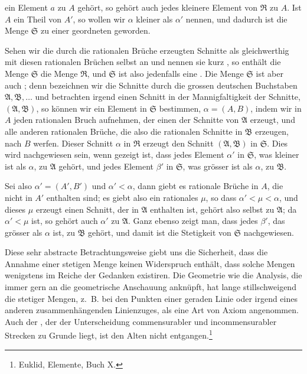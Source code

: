 ein Element $a$ zu $A$ gehört, so gehört auch jedes kleinere Element
von $\mathfrak R$ zu $A$. Ist $A$ ein Theil von $A'$, so wollen wir
$\alpha$ kleiner als $\alpha'$ nennen, und dadurch ist die Menge
$\mathfrak S$ zu einer geordneten geworden.

Sehen wir die durch die rationalen Brüche erzeugten Schnitte als
gleichwerthig mit diesen rationalen Brüchen selbst an und nennen sie
kurz , so enthält die Menge $\mathfrak S$
die Menge $\mathfrak R$, und $\mathfrak S$ ist also jedenfalls eine
. Die Menge $\mathfrak S$ ist aber auch
; denn bezeichnen wir die Schnitte durch die grossen
deutschen Buchstaben $\mathfrak A,\mathfrak B,\ldots$ und betrachten
irgend einen Schnitt in der Mannigfaltigkeit der Schnitte,
$(\mathfrak A,\mathfrak B)$, so können wir ein Element in
$\mathfrak S$ bestimmen, $\alpha=(A,B)$, indem wir in $A$ jeden
rationalen Bruch aufnehmen, der einen der Schnitte von $\mathfrak A$
erzeugt, und alle anderen rationalen Brüche, die also die rationalen
Schnitte in $\mathfrak B$ erzeugen, nach $B$ werfen. Dieser Schnitt
$\alpha$ in $\mathfrak R$ erzeugt den Schnitt
$(\mathfrak A,\mathfrak B)$ in $\mathfrak S$. Dies wird nachgewiesen
sein, wenn gezeigt ist, dass jedes Element $\alpha'$ in $\mathfrak S$,
was kleiner ist als $\alpha$, zu $\mathfrak A$ gehört, und jedes
Element $\beta'$ in $\mathfrak S$, was grösser ist als $\alpha$, zu
$\mathfrak B$.

Sei also $\alpha'=(A',B')$ und $\alpha'<\alpha$, dann giebt es
rationale Brüche in $A$, die nicht in $A'$ enthalten sind; es giebt
also ein rationales $\mu$, so dass $\alpha'<\mu<\alpha$, und dieses
$\mu$ erzeugt einen Schnitt, der in $\mathfrak A$ enthalten ist,
gehört also selbst zu $\mathfrak A$; da $\alpha'<\mu$ ist, so gehört
auch $\alpha'$ zu $\mathfrak A$. Ganz ebenso zeigt man, dass jedes
$\beta'$, das grösser als $\alpha$ ist, zu $\mathfrak B$ gehört, und
damit ist die Stetigkeit von $\mathfrak S$ nachgewiesen.

Diese sehr abstracte Betrachtungsweise giebt uns die Sicherheit, dass
die Annahme einer stetigen Menge keinen Widerspruch enthält, dass
solche Mengen wenigstens im Reiche der Gedanken existiren. Die
Geometrie wie die Analysis, die immer gern an die geometrische
Anschauung anknüpft, hat lange stillschweigend die 
stetiger Mengen, z.~B. bei den Punkten einer geraden Linie oder irgend
eines anderen zusammenhängenden Linienzuges, als eine Art von Axiom
angenommen. Auch der , der der Unterscheidung commensurabler und
incommensurabler Strecken zu Grunde liegt, ist den Alten nicht
entgangen.\setcounter{footnote}{0}\footnote{Euklid, Elemente, Buch X.}
